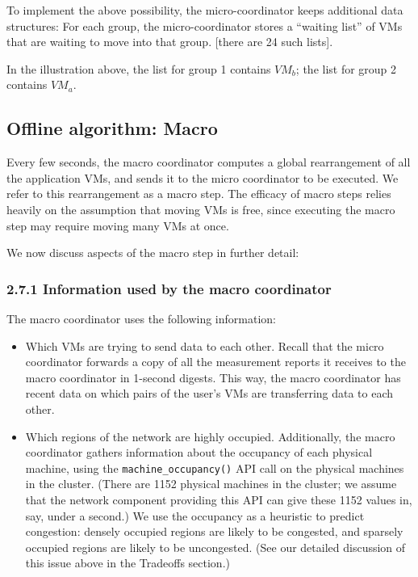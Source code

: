 \documentclass[11pt]{article}
\begin{document}
To implement the above possibility, the micro-coordinator keeps additional data structures:
For each group, the micro-coordinator stores a “waiting list” of VMs that are waiting to move into that group. [there are 24 such lists].

In the illustration above, the list for group 1 contains ${VM}_b$; the list for group 2 contains ${VM}_a$.

\FloatBarrier

\subsection{Offline algorithm: Macro}

Every few seconds, the macro coordinator computes a global rearrangement of all the application VMs, and sends it to the micro coordinator to be executed.  We refer to this rearrangement as a macro step.  The efficacy of macro steps relies heavily on the assumption that moving VMs is free, since executing the macro step may require moving many VMs at once.

We now discuss aspects of the macro step in further detail:

\subsubsection{2.7.1 Information used by the macro coordinator}

The macro coordinator uses the following information:

\vspace{-4mm}
\begin{itemize}
  \item 
Which VMs are trying to send data to each other.  Recall that the micro coordinator forwards a copy of all the measurement reports it receives to the macro coordinator in 1-second digests.  This way, the macro coordinator has recent data on which pairs of the user's VMs are transferring data to each other.
  \item
  Which regions of the network are highly occupied.  Additionally, the macro coordinator gathers information about the occupancy of each physical machine, using the \Verb"machine_occupancy()" API call on the physical machines in the cluster.  (There are 1152 physical machines in the cluster; we assume that the network component providing this API can give these 1152 values in, say, under a second.)   We use the occupancy as a heuristic to predict congestion: densely occupied regions are likely to be congested, and sparsely occupied regions are likely to be uncongested.  (See our detailed discussion of this issue above in the Tradeoffs section.)
  
\end{itemize}
\end{document}
